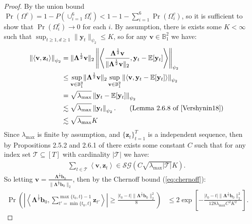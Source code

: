 \begin{proof}

By the union bound $\Pr(\Omega^c) = 1 - P(\cup_{i=1}^6 \Omega^c_i) < 1 - 1 - \sum_{i=1}^6 \Pr(\Omega^c_i)$, so it is sufficient to show that $\Pr(\Omega^c_i) \to 0$ for each $i$. By assumption, there is exists some $K < \infty$ such that $\sup_{t\geq 1, d\geq 1} \lVert \mathbf{y}_t\rVert_{\psi_2} \leq K$, so for any $\mathbf{v} \in \mathbb{B}^2_1$ we have:
\begin{align*}
    \left\lVert\left\langle\mathbf{v}, \mathbf{z}_t \right\rangle\right\rVert_{\psi_2} &= \lVert \boldsymbol{\Lambda}^{\frac{1}{2}}\mathbf{v}\rVert_{2}\left\lVert\left\langle\frac{\boldsymbol{\Lambda}^{\frac{1}{2}}\mathbf{v}}{\lVert \boldsymbol{\Lambda}^{\frac{1}{2}}\mathbf{v} \rVert_2}, \mathbf{y}_t - \E[\mathbf{y}_t] \right\rangle\right\rVert_{\psi_2} \\
    &\leq \sup_{\mathbf{v} \in  \mathbb{B}^2_1}\lVert\boldsymbol{\Lambda}^{\frac{1}{2}}\mathbf{v}\rVert_{2} \sup_{\mathbf{v} \in  \mathbb{B}^2_1} \left\lVert\left\langle\mathbf{v}, \mathbf{y}_t - \E[\mathbf{y}_t] \right\rangle\right\rVert_{\psi_2}\\
    &= \sqrt{\lambda_{\max}} \left\lVert\mathbf{y}_t - \E[\mathbf{y}_t] \right\rVert_{\psi_2} \\
    &\lesssim \sqrt{\lambda_{\max}} \left\lVert\mathbf{y}_t \right\rVert_{\psi_2}. \tag{Lemma 2.6.8 of \cite{Vershynin18}} \\
    &\lesssim \sqrt{\lambda_{\max}} K
\end{align*}
Since $\lambda_{\max}$ is finite by assumption, and $\{\mathbf{z}_t\}_{t=1}^T$ is a independent sequence, then by Propositions 2.5.2 and 2.6.1 of \cite{Vershynin18} there exists some constant $C$ such that for any index set $\mathcal{T} \subseteq [T]$ with cardinality $|\mathcal{T}|$ we have: 
\begin{align*}
    \sum_{t \in \mathcal{T}} \left\langle\mathbf{v}, \mathbf{z}_t \right\rangle \in \mathcal{SG}\left(C\sqrt{\lambda_{\max}|\mathcal{T}|} K\right).
\end{align*}
So letting $\mathbf{v} = \frac{\boldsymbol{\Lambda}^{\frac{1}{2}}\mathbf{b}_0}{\lVert \boldsymbol{\Lambda}^{\frac{1}{2}}\mathbf{b}_0 \rVert_2}$, then by the Chernoff bound (\ref{eq:chernoff}): 
\begin{align*}
    \Pr\left(\left|\left\langle\boldsymbol{\Lambda}^{\frac{1}{2}}\mathbf{b}_0, \sum_{t'=\min\{t_0,t\}}^{\max\{t_0,t\}-1}\mathbf{z}_{t'} \right\rangle\right| \geq \frac{|t_0-t| \lVert\boldsymbol{\Lambda}^{\frac{1}{2}} \mathbf{b}_0\rVert_2^2}{8}\right) &\leq 2\exp\left[-\frac{|t_0-t|\lVert\boldsymbol{\Lambda}^{\frac{1}{2}} \mathbf{b}_0\rVert^2_2}{128\lambda_{\max}C^2K^2}\right].

\end{align*}
\end{proof}
